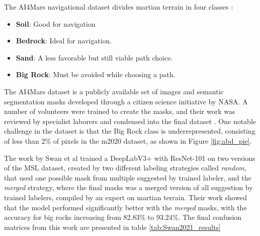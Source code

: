 \documentclass[10pt, conference]{IEEEtran}
\begin{document}
The AI4Mars navigational dataset divides martian terrain in four classes \cite{Swan2021} :
\begin{itemize}
\item \textbf{Soil}: Good for navigation
\item \textbf{Bedrock}: Ideal for navigation.  
\item \textbf{Sand}: A less favorable but still viable path choice.
\item \textbf{Big Rock}: Must be avoided while choosing a path.
\end{itemize}

The AI4Mars dataset is a publicly available set of images and semantic 
segmentation masks developed through a citizen science initiative by 
NASA. A number of volunteers were trained to create the masks, and 
their work was reviewed by specialist laborers and condensed into the 
final dataset \cite{Swan2021}. One notable challenge in the dataset is that the Big Rock class is 
underrepresented, consisting of less than 2\% of pixels in the m2020 
dataset, as shown in Figure \ref{fig:abd_pie}.

The work by Swan et al \cite{Swan2021} trained a DeepLabV3+ with ResNet-101 on two versions of the
MSL dataset, created by two  different labeling strategies called \textit{random}, that used one possible
mask from multiple suggested by trained labeler, and the \textit{merged} strategy, where the final
masks was a merged version of all suggestion by trained labelers, compiled by an expert on martian
terrain. Their work showed that the model performed significantly better with the \textit{merged}
masks, with the accuracy for big rocks increasing from 82.83\% to 93.24\%. The final confusion
matrices from this work are presented in table \ref{tab:Swan2021_results}
\end{document}
